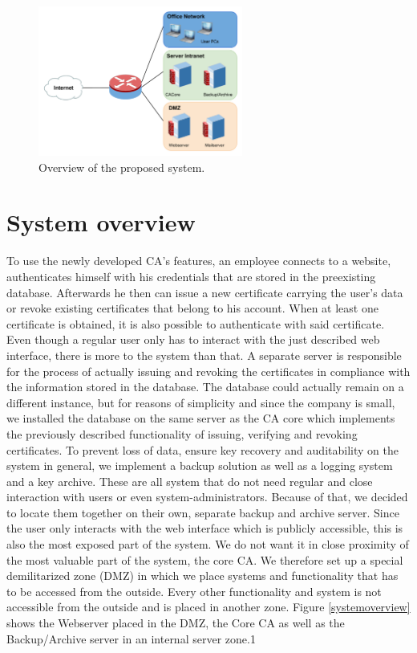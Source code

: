 \documentclass[a4paper, toc=index, 12pt, DIV14, twoside, BCOR2cm, headsepline, numbers=noenddot, bibliography=totoc]{scrbook}
\begin{document}
\begin{figure}[H]
  \centering
    \includegraphics[width=0.6\textwidth]{images/new_overview.pdf}  
  \caption{Overview of the proposed system.}
  \label{newoverview}
\end{figure}

\section{System overview}
To use the newly developed CA's features, an employee connects to a website, authenticates himself with his credentials that are stored in the preexisting database. Afterwards he then can issue a new certificate carrying the user's data or revoke existing certificates that belong to his account. When at least one certificate is obtained, it is also possible to authenticate with said certificate. Even though a regular user only has to interact with the just described web interface, there is more to the system than that. A separate server is responsible for the process of actually issuing and revoking the certificates in compliance with the information stored in the database. The database could actually remain on a different instance, but for reasons of simplicity and since the company is small, we installed the database on the same server as the CA core which implements the previously described functionality of issuing, verifying and revoking certificates. To prevent loss of data, ensure key recovery and auditability on the system in general, we implement a backup solution as well as a logging system and a key archive. These are all system that do not need regular and close interaction with users or even system-administrators. Because of that, we decided to locate them together on their own, separate backup and archive server.\newline
Since the user only interacts with the web interface which is publicly accessible, this is also the most exposed part of the system. We do not want it in close proximity of the most valuable part of the system, the core CA. We therefore set up a special demilitarized zone (DMZ) in which we place systems and functionality that has to be accessed from the outside. Every other functionality and system is not accessible from the outside and is placed in another zone.\newline
Figure \ref{systemoverview} shows the Webserver placed in the DMZ, the Core CA as well as the Backup/Archive server in an internal server zone.1
\end{document}
